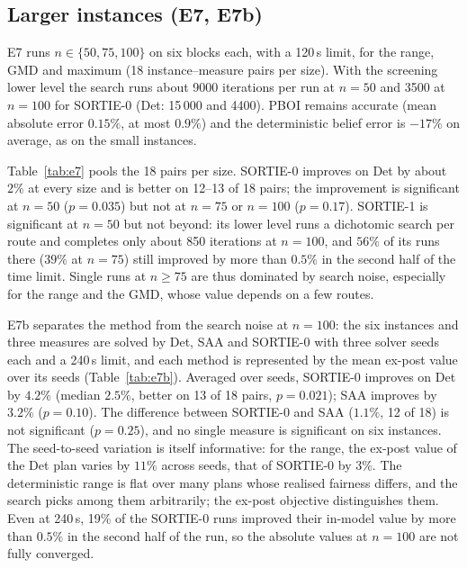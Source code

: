 \documentclass[11pt]{article}
\begin{document}
\subsection{Larger instances (E7, E7b)}
E7 runs $n\in\{50,75,100\}$ on six blocks each, with a 120\,s limit, for the
range, GMD and maximum (18 instance--measure pairs per size). With the
screening lower level the search runs about 9000 iterations per run at
$n=50$ and 3500 at $n=100$ for SORTIE-0 (Det: 15\,000 and 4400). PBOI remains
accurate (mean absolute error $0.15\%$, at most $0.9\%$) and the deterministic
belief error is $-17\%$ on average, as on the small instances.

Table~\ref{tab:e7} pools the 18 pairs per size. SORTIE-0 improves on Det by
about $2\%$ at every size and is better on 12--13 of 18 pairs; the improvement
is significant at $n=50$ ($p=0.035$) but not at $n=75$ or $n=100$
($p=0.17$). SORTIE-1 is significant at $n=50$ but not beyond: its lower level
runs a dichotomic search per route and completes only about 850 iterations at
$n=100$, and $56\%$ of its runs there ($39\%$ at $n=75$) still improved by
more than $0.5\%$ in the second half of the time limit. Single runs at $n\ge75$ are thus dominated by search
noise, especially for the range and the GMD, whose value depends on a few
routes.

E7b separates the method from the search noise at $n=100$: the six instances
and three measures are solved by Det, SAA and SORTIE-0 with three solver seeds
each and a 240\,s limit, and each method is represented by the mean ex-post
value over its seeds (Table~\ref{tab:e7b}). Averaged over seeds, SORTIE-0
improves on Det by $4.2\%$ (median $2.5\%$, better on 13 of 18 pairs,
$p=0.021$); SAA improves by $3.2\%$ ($p=0.10$). The difference between
SORTIE-0 and SAA ($1.1\%$, 12 of 18) is not significant ($p=0.25$), and no
single measure is significant on six instances. The seed-to-seed variation is
itself informative: for the range, the ex-post value of the Det plan varies by
$11\%$ across seeds, that of SORTIE-0 by $3\%$. The deterministic range is flat
over many plans whose realised fairness differs, and the search picks among
them arbitrarily; the ex-post objective distinguishes them. Even at 240\,s,
19\% of the SORTIE-0 runs improved their in-model value by more than
$0.5\%$ in the second half of the run, so the absolute values at $n=100$ are
not fully converged.

\begin{table}[t]\centering\small
\caption{E7: improvement of the ex-post value over Det, $B=1.10$, 120\,s,
pooled over six instances and three measures (range, GMD, max); format as
Table~\ref{tab:e3}.}\label{tab:e7}

\end{table}
\end{document}
